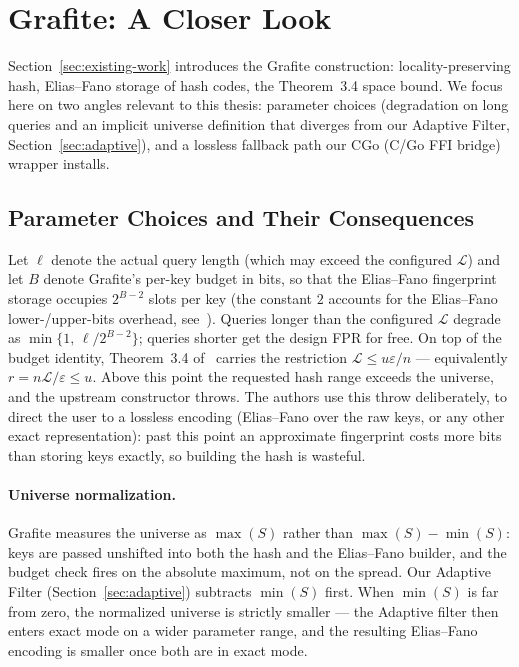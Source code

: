 \section{Grafite: A Closer Look}
\label{sec:grafite-deep-dive}

Section~\ref{sec:existing-work} introduces the Grafite construction:
locality-preserving hash, Elias--Fano storage of hash codes, the
Theorem~3.4 space bound. We focus here on two angles relevant to
this thesis: parameter choices (degradation on long queries
and an implicit universe definition that diverges from our Adaptive
Filter, Section~\ref{sec:adaptive}), and a lossless fallback path
our CGo (C/Go FFI bridge) wrapper installs.

\subsection{Parameter Choices and Their Consequences}
\label{subsec:grafite-params}

Let $\ell$ denote the actual query length (which may exceed the
configured $\mathcal{L}$) and let $B$ denote Grafite's per-key budget
in bits, so that the Elias--Fano fingerprint storage occupies
$2^{B-2}$ slots per key (the constant $2$ accounts for the
Elias--Fano lower-/upper-bits overhead, see~\citep{grafite2024}).
Queries longer than the configured $\mathcal{L}$ degrade
as $\min\{1,\,\ell/2^{B-2}\}$; queries shorter get the design FPR
for free. On top of the budget identity, Theorem~3.4
of~\citep{grafite2024} carries the restriction
$\mathcal{L} \leq u\varepsilon/n$ --- equivalently
$r = n\mathcal{L}/\varepsilon \leq u$. Above this point the requested
hash range exceeds the universe, and the upstream constructor throws.
The authors use this throw deliberately, to direct the user to a
lossless encoding (Elias--Fano over the raw keys, or any other exact
representation): past this point an approximate fingerprint costs more
bits than storing keys exactly, so building the hash is wasteful.

\paragraph{Universe normalization.}
Grafite measures the universe as $\max(S)$ rather than
$\max(S) - \min(S)$: keys are passed unshifted into both the hash and
the Elias--Fano builder, and the budget check fires on the absolute
maximum, not on the spread. Our Adaptive Filter
(Section~\ref{sec:adaptive}) subtracts $\min(S)$ first. When $\min(S)$
is far from zero, the normalized universe is strictly smaller --- the
Adaptive filter then enters exact mode on a wider parameter range,
and the resulting Elias--Fano encoding is smaller once both are in
exact mode.


